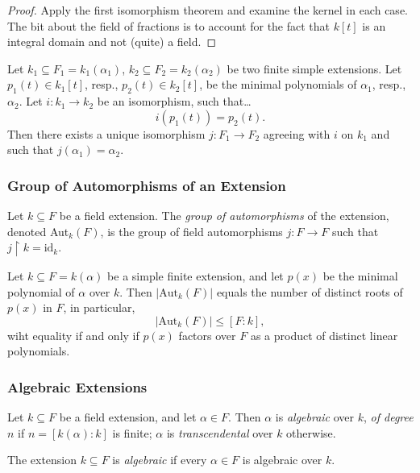 \begin{proof}
Apply the first isomorphism theorem and examine the kernel in each case. The bit about the field of fractions
is to account for the fact that $k[t]$ is an integral domain and not (quite) a field.
\end{proof}

\begin{proposition}
\label{extensionofextension}
Let $k_1 \subseteq F_1 = k_1(\alpha_1)$, $k_2 \subseteq F_2 = k_2(\alpha_2)$ be two finite simple
extensions. Let $p_1(t) \in k_1[t]$, resp., $p_2(t) \in k_2[t]$, be the minimal polynomials of $\alpha_1$,
resp., $\alpha_2$. Let $i : k_1 \rightarrow k_2$ be an isomorphism, such that\dots
$$i(p_1(t)) = p_2(t).$$
Then there exists a unique isomorphism $j : F_1 \rightarrow F_2$ agreeing with $i$ on $k_1$ and such that
$j(\alpha_1) = \alpha_2$.
\end{proposition}

\subsubsection{Group of Automorphisms of an Extension}\label{grpautomorphismext}

Let $k \subseteq F$ be a field extension. The \emph{group of automorphisms} of the extension,
denoted Aut$_k(F)$, is the group of field automorphisms $j : F \rightarrow F$ such that $j \upharpoonright k = \textrm{id}_k$.

\begin{corollary}
Let $k \subseteq F = k(\alpha)$ be a simple finite extension, and let $p(x)$ be the minimal polynomial of $\alpha$
over $k$. Then $|\textrm{Aut}_k(F)|$ equals the number of distinct roots of $p(x)$ in $F$, in particular,
$$|\textrm{Aut}_k(F)| \leq [F : k],$$
wiht equality if and only if $p(x)$ factors over $F$ as a product of distinct linear polynomials.
\end{corollary}

\subsubsection{Algebraic Extensions}\label{algebraicextension}
Let $k \subseteq F$ be a field extension, and let $\alpha \in F$. Then $\alpha$ is \emph{algebraic} over $k$,
\emph{of degree} $n$ if $n = [k(\alpha) : k]$ is finite; $\alpha$ is \emph{transcendental} over $k$ otherwise.\newline

\noindent The extension $k \subseteq F$ is \emph{algebraic} if every $\alpha \in F$ is algebraic over $k$.

